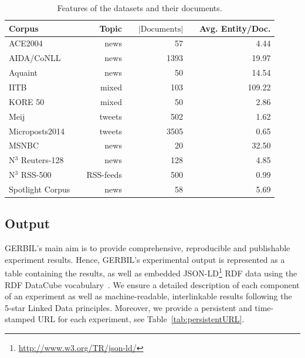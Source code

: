\begin{table}
    \begin{tabular}{lp{0.25cm}rp{0.25cm}rp{0.25cm}r}
     \toprule
     Corpus && Topic && \multicolumn{1}{c}{$\left|\text{Documents}\right|$} && \multicolumn{1}{c}{Avg. Entity/Doc.} \\
    \midrule
ACE2004          && news            &&   57 &&   4.44\\
AIDA/CoNLL       && news            && 1393 &&  19.97\\
Aquaint          && news            &&   50 &&  14.54\\
IITB             && mixed           &&  103 && 109.22\\
KORE 50          && mixed           &&   50 &&   2.86\\
Meij             && tweets          &&  502 &&   1.62\\
Microposts2014   && tweets          && 3505 &&   0.65\\
MSNBC            && news            &&   20 &&  32.50\\
N$^3$ Reuters-128&& news            &&  128 &&   4.85\\
N$^3$ RSS-500    && RSS-feeds       &&  500 &&   0.99\\
Spotlight Corpus && news            &&   58 &&   5.69\\
	\bottomrule
	\end{tabular}
	\centering
    \caption{Features of the datasets and their documents.}
	\label{tab:corpus_stats}
\end{table}

\subsection{Output}
\label{sec:output}
GERBIL's main aim is to provide comprehensive, reproducible and publishable experiment results.
Hence, GERBIL's experimental output is represented as a table containing the results, as well as embedded JSON-LD\footnote{\url{http://www.w3.org/TR/json-ld/}} RDF data using the RDF DataCube vocabulary~\cite{datacube}.
We ensure a detailed description of each component of an experiment as well as machine-readable, interlinkable results following the 5-star Linked Data principles.
Moreover, we provide a persistent and time-stamped URL for each experiment, see Table~\ref{tab:persistentURL}.

